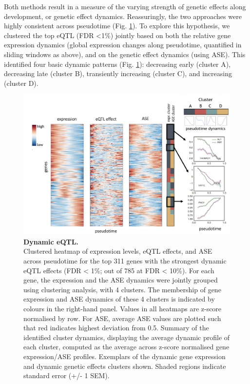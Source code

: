 Both methods result in a measure of the varying strength of genetic effects along development, or genetic effect dynamics. 
Reassuringly, the two approaches were highly consistent across pseudotime (Fig. \ref{fig:endodiff_dynamic_eqtl}).
To explore this hypothesis, we clustered the top eQTL (FDR <1\%) jointly based on both the relative gene expression dynamics (global expression changes along pseudotime, quantified in sliding windows as above), and on the genetic effect dynamics (using ASE). 
This identified four basic dynamic patterns (Fig. \ref{fig:endodiff_dynamic_eqtl}): decreasing early (cluster A), decreasing late (cluster B), transiently increasing (cluster C), and increasing (cluster D). 
\begin{figure}[htbp]
\centering
\includegraphics[width=15.5cm]{Chapter4/Fig/endodiff_pseudo_heatmap.png}
\caption[Dynamic eQTL]{\textbf{Dynamic eQTL.}\\
Clustered heatmap of expression levels, eQTL effects, and ASE across pseudotime for the top 311 genes with the strongest dynamic eQTL effects (FDR < 1\%; out of 785 at FDR < 10\%). 
For each gene, the expression and the ASE dynamics were jointly grouped using clustering analysis, with 4 clusters. The membership of gene expression and ASE dynamics of these 4 clusters is indicated by colours in the right-hand panel. Values in all heatmaps are z-score normalised by row. 
For ASE, average ASE values are plotted such that red indicates highest deviation from 0.5.
Summary of the identified cluster dynamics, displaying the average dynamic profile
of each cluster, computed as the average across z-score normalised gene expression/ASE profiles. 
Exemplars of the dynamic gene expression and dynamic genetic effects clusters shown.
Shaded regions indicate standard error (+/- 1 SEM).}
\label{fig:endodiff_dynamic_eqtl}
\end{figure}
